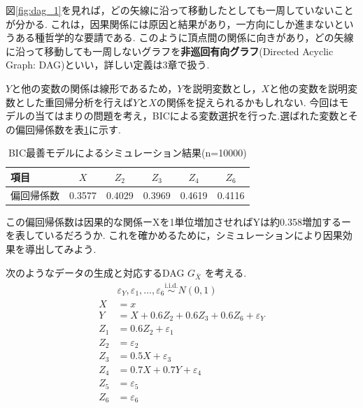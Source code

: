 \documentclass[uplatex, dvipdfmx]{jsarticle}
\begin{document}
図\ref{fig:dag_1}を見れば，どの矢線に沿って移動したとしても一周していないことが分かる.
これは，因果関係には原因と結果があり，一方向にしか進まないというある種哲学的な要請である.
このように頂点間の関係に向きがあり，どの矢線に沿って移動しても一周しないグラフを\textbf{非巡回有向グラフ}(Directed Acyclic Graph: DAG)といい，詳しい定義は3章で扱う.

$Y$と他の変数の関係は線形であるため，$Y$を説明変数とし，$X$と他の変数を説明変数とした重回帰分析を行えば$Y$と$X$の関係を捉えられるかもしれない.
今回はモデルの当てはまりの問題を考え，BICによる変数選択を行った.選ばれた変数とその偏回帰係数を表\ref{tab:results}に示す.

\begin{table}[htbp]
  \centering
  \caption{BIC最善モデルによるシミュレーション結果(n=10000)}
  \label{tab:results}
  \begin{tabular}{lccccc} %
    \hline
    項目 & $X$ & $Z_2$ & $Z_3$ & $Z_4$ & $Z_6$ \\ \hline
    偏回帰係数 & 0.3577 & 0.4029 & 0.3969 & 0.4619 & 0.4116 \\ \hline
  \end{tabular}
\end{table}

この偏回帰係数は因果的な関係ーXを1単位増加させればYは約0.358増加するーを表しているだろうか.
これを確かめるために，シミュレーションにより因果効果を導出してみよう.

次のようなデータの生成と対応するDAG $G_{\bar{X}}$ を考える.
\begin{align}
  &\varepsilon_Y, \varepsilon_1, \dots, \varepsilon_6 \overset{\text{i.i.d.}}{\sim} N(0, 1) \\
  X  &= x \\
  Y  &= X + 0.6Z_2 + 0.6Z_3 + 0.6Z_6 + \varepsilon_Y \\
  Z_1 &= 0.6Z_2 + \varepsilon_1 \\
  Z_2 &= \varepsilon_2 \\
  Z_3 &= 0.5X + \varepsilon_3 \\
  Z_4 &= 0.7X + 0.7Y + \varepsilon_4 \\
  Z_5 &= \varepsilon_5 \\
  Z_6 &= \varepsilon_6 
\end{align}
\end{document}
